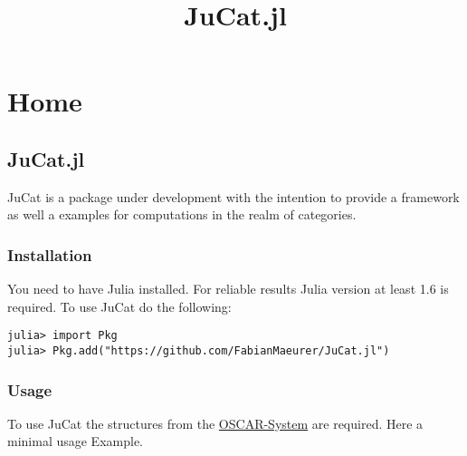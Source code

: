 \documentclass{memoir}
\title{
    {\HUGE JuCat.jl}\\
    {\Large }
}
\author{}
\begin{document}
\frontmatter
\maketitle
\tableofcontents

\mainmatter



\part{Home}


\hypertarget{4258390056622400630}{}


\chapter{JuCat.jl}



JuCat is a package under development with the intention to provide a framework as well a examples for computations in the realm of categories.



\hypertarget{14749083378597845891}{}


\section{Installation}



You need to have Julia installed. For reliable results Julia version at least 1.6 is required. To use JuCat do the following:




\begin{verbatim}
julia> import Pkg
julia> Pkg.add("https://github.com/FabianMaeurer/JuCat.jl")
\end{verbatim}



\hypertarget{18018887822361824029}{}


\section{Usage}



To use JuCat the structures from the \href{https://github.com/oscar-system/Oscar.jl}{OSCAR-System} are required. Here a minimal usage Example.
\end{document}
